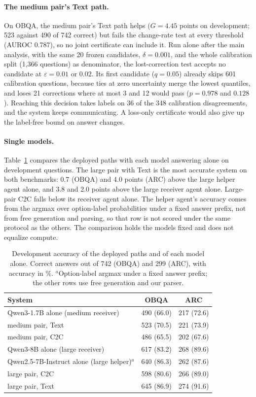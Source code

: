 \paragraph{The medium pair's Text path.} On OBQA, the medium pair's Text path helps ($G=4.45$ points on development; 523 against 490 of 742 correct) but fails the change-rate test at every threshold (AUROC 0.787), so no joint certificate can include it. Run alone after the main analysis, with the same 20 frozen candidates, $\delta=0.001$, and the whole calibration split (1,366 questions) as denominator, the lost-correction test accepts no candidate at $\varepsilon=0.01$ or $0.02$. Its first candidate ($q=0.05$) already skips 601 calibration questions, because ties at zero uncertainty merge the lowest quantiles, and loses 21 corrections where at most 3 and 12 would pass ($p=0.978$ and $0.128$). Reaching this decision takes labels on 36 of the 348 calibration disagreements, and the system keeps communicating. A loss-only certificate would also give up the label-free bound on answer changes.

\paragraph{Single models.}\label{app:singlemodel} Table~\ref{tab:singlemodel} compares the deployed paths with each model answering alone on development questions. The large pair with Text is the most accurate system on both benchmarks: 0.7 (OBQA) and 4.0 points (ARC) above the large helper agent alone, and 3.8 and 2.0 points above the large receiver agent alone. Large-pair C2C falls below its receiver agent alone. The helper agent's accuracy comes from the argmax over option-label probabilities under a fixed answer prefix, not from free generation and parsing, so that row is not scored under the same protocol as the others. The comparison holds the models fixed and does not equalize compute.

\begin{table}[!htbp]\centering\scriptsize
\caption{Development accuracy of the deployed paths and of each model alone. Correct answers out of 742 (OBQA) and 299 (ARC), with accuracy in \%. $^{a}$Option-label argmax under a fixed answer prefix; the other rows use free generation and our parser.}
\label{tab:singlemodel}
\begin{tabular*}{\linewidth}{@{}l@{\extracolsep{\fill}}cc@{}}\toprule
System & OBQA & ARC\\\midrule
Qwen3-1.7B alone (medium receiver) & 490 (66.0) & 217 (72.6)\\
medium pair, Text & 523 (70.5) & 221 (73.9)\\
medium pair, C2C & 486 (65.5) & 202 (67.6)\\\midrule
Qwen3-8B alone (large receiver) & 617 (83.2) & 268 (89.6)\\
Qwen2.5-7B-Instruct alone (large helper)$^{a}$ & 640 (86.3) & 262 (87.6)\\
large pair, C2C & 598 (80.6) & 266 (89.0)\\
large pair, Text & 645 (86.9) & 274 (91.6)\\\bottomrule
\end{tabular*}
\end{table}

